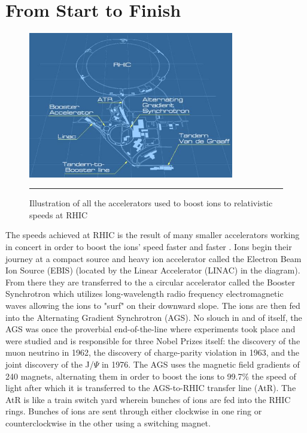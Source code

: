 \section{From Start to Finish}
\begin{figure}[htbp]
  \centering
    \includegraphics[width=0.8\textwidth]{Figures/RHICdiagram.JPG}
    \rule{35em}{0.5pt}
  \caption[Illustration of all the accelerators used to boost ions to relativistic speeds at RHIC]{Illustration of all the accelerators used to boost ions to relativistic speeds at RHIC}
  \label{fig:run8config}
\end{figure}
The speeds achieved at RHIC is the result of many smaller accelerators working in concert in order to boost the ions' speed faster and faster \citep{RHICaccel}.  Ions begin their journey at a compact source and heavy ion accelerator called the Electron Beam Ion Source (EBIS) (located by the Linear Accelerator (LINAC) in the diagram). From there they are transferred to the a circular accelerator called the Booster Synchrotron which utilizes long-wavelength radio frequency electromagnetic waves allowing the ions to "surf" on their downward slope. The ions are then fed into the Alternating Gradient Synchrotron (AGS). No slouch in and of itself, the AGS was once the proverbial end-of-the-line where experiments took place and were studied and is responsible for three Nobel Prizes itself: the discovery of the muon neutrino in 1962, the discovery of charge-parity violation in 1963, and the joint discovery of the J/$\Psi$ in 1976. The AGS uses the magnetic field gradients of 240 magnets, alternating them in order to boost the ions to 99.7$\%$ the speed of light after which it is transferred to the AGS-to-RHIC transfer line (AtR). The AtR is like a train switch yard wherein bunches of ions are fed into the RHIC rings. Bunches of ions are sent through either clockwise in one ring or counterclockwise in the other using a switching magnet.

